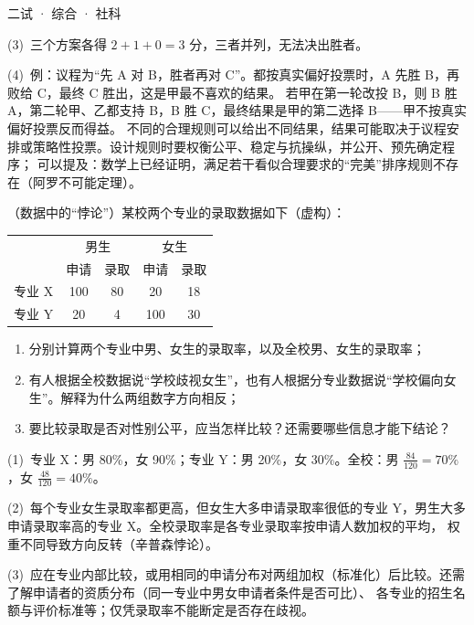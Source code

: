 \documentclass[cjk=noto, seal=first]{mojing-exam}
\begin{document}
\begin{paper}[time={建议 1.5 小时（训练设置）}, full=100]{二试 · 综合 · 社科}
\begin{questions}
\begin{solution}
(3)~三个方案各得 $2+1+0=3$ 分，三者并列，无法决出胜者。

(4)~例：议程为“先 A 对 B，胜者再对 C”。都按真实偏好投票时，A 先胜 B，再败给 C，最终 C 胜出，这是甲最不喜欢的结果。
若甲在第一轮改投 B，则 B 胜 A，第二轮甲、乙都支持 B，B 胜 C，最终结果是甲的第二选择 B——甲不按真实偏好投票反而得益。
不同的合理规则可以给出不同结果，结果可能取决于议程安排或策略性投票。设计规则时要权衡公平、稳定与抗操纵，并公开、预先确定程序；
可以提及：数学上已经证明，满足若干看似合理要求的“完美”排序规则不存在（阿罗不可能定理）。
\end{solution}

\question[25]
（数据中的“悖论”）某校两个专业的录取数据如下（虚构）：
\begin{center}
\begin{tabular}{c|cc|cc}
  \toprule
  & \multicolumn{2}{c|}{男生} & \multicolumn{2}{c}{女生} \\
  & 申请 & 录取 & 申请 & 录取 \\
  \midrule
  专业 X & 100 & 80 & 20 & 18 \\
  专业 Y & 20 & 4 & 100 & 30 \\
  \bottomrule
\end{tabular}
\end{center}
\begin{enumerate}
  \item 分别计算两个专业中男、女生的录取率，以及全校男、女生的录取率；
  \item 有人根据全校数据说“学校歧视女生”，也有人根据分专业数据说“学校偏向女生”。解释为什么两组数字方向相反；
  \item 要比较录取是否对性别公平，应当怎样比较？还需要哪些信息才能下结论？
\end{enumerate}
\answerspace{2cm}
\begin{solution}
(1)~专业 X：男 80\%，女 90\%；专业 Y：男 20\%，女 30\%。全校：男 $\frac{84}{120}=70\%$，女 $\frac{48}{120}=40\%$。

(2)~每个专业女生录取率都更高，但女生大多申请录取率很低的专业 Y，男生大多申请录取率高的专业 X。全校录取率是各专业录取率按申请人数加权的平均，
权重不同导致方向反转（辛普森悖论）。

(3)~应在专业内部比较，或用相同的申请分布对两组加权（标准化）后比较。还需了解申请者的资质分布（同一专业中男女申请者条件是否可比）、
各专业的招生名额与评价标准等；仅凭录取率不能断定是否存在歧视。
\end{solution}


\end{questions}
\end{paper}
\end{document}
